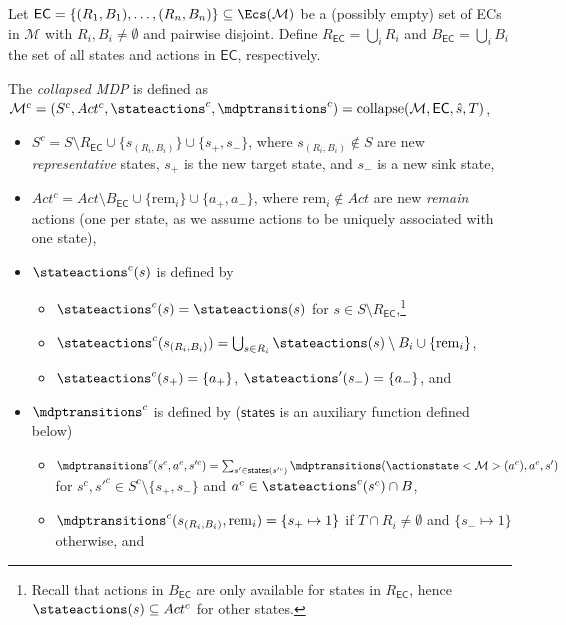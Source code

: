 \documentclass{article}
\newcommand{\unionSym}{\cup}
\newcommand{\unionBin}{\mathbin{\unionSym}}
\newcommand{\intersectionSym}{\cap}
\newcommand{\intersectionBin}{\mathbin{\intersectionSym}}
\newcommand{\UnionSym}{\bigcup}
\newcommand{\union}{\unionBin}
\newcommand{\intersection}{\intersectionBin}
\newcommand{\Union}{\UnionSym}
\newcommand{\MDP}{\mathcal{M}}
\newcommand{\States}{S}
\newcommand{\initialstate}{\hat{s}}
\newcommand{\Actions}{Act}
\newcommand{\targetstate}{s_+}
\newcommand{\sinkstate}{s_-}
\newcommand{\targetset}{T}
\DeclareMathOperator{\collapse}{collapse}
\newcommand{\ecremain}{\mathrm{rem}}
\newcommand{\ecstates}{\mathsf{states}}
\newcommand{\algoecs}{\mathsf{EC}}
\begin{document}
\begin{definition}
	Let $\algoecs = \{(R_1, B_1), \dots, (R_n, B_n)\} \subseteq \Ecs(\MDP)$ be a (possibly empty) set of ECs in $\MDP$ with $R_i, B_i \neq \emptyset$ and pairwise disjoint.
	Define $R_{\algoecs} = \Union_i R_i$ and $B_{\algoecs} = \Union_i B_i$ the set of all states and actions in $\algoecs$, respectively.
	
	The \emph{collapsed MDP} is defined as $\MDP^c = (\States^c, \Actions^c, \stateactions^c, \mdptransitions^c) = \collapse(\MDP, \algoecs, \initialstate, \targetset)$,
	\begin{itemize}
		\item $\States^c = \States \setminus R_{\algoecs} \union \{s_{(R_i,B_i)}\} \union \{\targetstate, \sinkstate\}$, where $s_{(R_i, B_i)} \notin \States$ are new \emph{representative} states, $\targetstate$ is the new target state, and $\sinkstate$ is a new sink state,
		\item $\Actions^c = \Actions \setminus B_{\algoecs} \union \{\ecremain_i\} \union \{a_+, a_-\}$, where $\ecremain_i \notin \Actions$ are new \emph{remain} actions (one per state, as we assume actions to be uniquely associated with one state),
		\item $\stateactions^c(s)$ is defined by
		\begin{itemize}
			\item $\stateactions^c(s) = \stateactions(s)$ for $s \in \States \setminus R_{\algoecs}$,\footnote{Recall that actions in $B_{\algoecs}$ are only available for states in $R_{\algoecs}$, hence $\stateactions(s) \subseteq \Actions^c$ for other states.}
			\item $\stateactions^c(s_{(R_i,B_i)}) = \Union_{s \in R_i} \stateactions(s) \setminus B_i \union \{\ecremain_i\}$,
			\item $\stateactions^c(\targetstate) = \{a_+\}$, $\stateactions'(\sinkstate) = \{a_-\}$, and
		\end{itemize}
		\item $\mdptransitions^c$ is defined by ($\ecstates$ is an auxiliary function defined below)
		\begin{itemize}
			\item $\mdptransitions^c(s^c, a^c, s'^c) = \sum_{s' \in \ecstates(s'^c)} \mdptransitions(\actionstate<\MDP>(a^c), a^c, s')$ for $s^c, s'^c \in \States^c \setminus \{\targetstate, \sinkstate\}$ and $a^c \in \stateactions^c(s^c) \intersection B$,
			\item $\mdptransitions^c(s_{(R_i,B_i)}, \ecremain_i) = \{\targetstate \mapsto 1\}$ if $\targetset \intersection R_i \neq \emptyset$ and $\{\sinkstate \mapsto 1\}$ otherwise, and

\end{itemize}
\end{itemize}
\end{definition}
\end{document}
